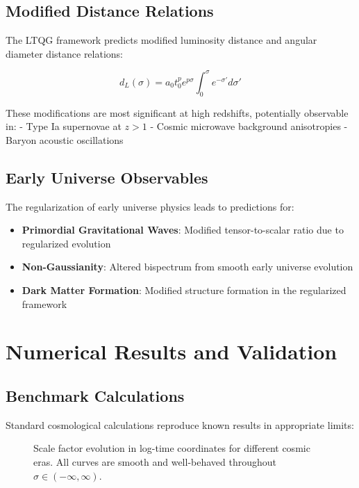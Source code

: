 \documentclass[11pt,a4paper]{article}
\begin{document}
\subsection{Modified Distance Relations}

The LTQG framework predicts modified luminosity distance and angular diameter distance relations:

\begin{equation}
d_L(\sigma) = a_0 t_0^p e^{p\sigma} \int_0^{\sigma} e^{-\sigma'} d\sigma'
\end{equation}

These modifications are most significant at high redshifts, potentially observable in:
- Type Ia supernovae at $z > 1$
- Cosmic microwave background anisotropies
- Baryon acoustic oscillations

\subsection{Early Universe Observables}

The regularization of early universe physics leads to predictions for:

\begin{itemize}
\item \textbf{Primordial Gravitational Waves}: Modified tensor-to-scalar ratio due to regularized evolution
\item \textbf{Non-Gaussianity}: Altered bispectrum from smooth early universe evolution
\item \textbf{Dark Matter Formation}: Modified structure formation in the regularized framework
\end{itemize}

\section{Numerical Results and Validation}

\subsection{Benchmark Calculations}

Standard cosmological calculations reproduce known results in appropriate limits:

\begin{figure}[h]
\centering
{}
\caption{Scale factor evolution in log-time coordinates for different cosmic eras. All curves are smooth and well-behaved throughout $\sigma \in (-\infty, \infty)$.}
\end{figure}
\end{document}

